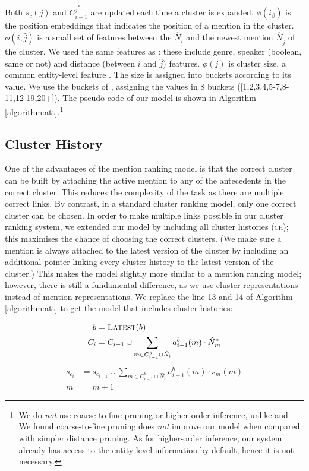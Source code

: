 \documentclass[10pt, a4paper]{article}
\newcommand{\ACRO}[1]{\textsc{#1}}
\begin{document}
Both $s_c(j)$ and $C^{j^*}_{i-1}$ are updated each time a cluster is expanded. 
$\phi(i_\beta)$ is the position embeddings that indicates the position of a mention in the cluster. $\phi(i,\hat{j})$ is a small set of features between the $\hat{N}_i$ and the newest mention $\hat{N}_{\hat{j}}$ of the cluster. 
We used the same features as :
these include genre, speaker (boolean, same or not) and distance (between $i$ and $\hat{j}$) features. $\phi(j)$ is cluster size, 
a common entity-level feature \cite{bjorkelund2014learning}. 
The size is assigned into buckets according to its value. We use the buckets of , assigning the values in 8 buckets ([1,2,3,4,5-7,8-11,12-19,20+]).
The pseudo-code of our model is shown in Algorithm \ref{algorithm:att}.\footnote{We do \textit{not} use  coarse-to-fine pruning or higher-order inference, unlike  and .  
We found coarse-to-fine pruning  does \textit{not} improve our model when compared with simpler distance pruning. 
As for higher-order inference, our system  already has access to the entity-level information by default, hence it is not necessary.} 


\subsection{Cluster History}

One of the advantages of the mention ranking model is that the correct cluster can be built by attaching the active mention to any of the antecedents in the correct cluster. 
This reduces the complexity of the task as there are multiple correct links. 
By contrast, in a standard cluster ranking model, only one correct cluster can be chosen. 
In order to make 
multiple links possible in our
cluster ranking system, we extended our
model by including all cluster histories (\ACRO{ch});
this maximises the chance of choosing 
the correct clusters.  
(We make sure a mention is always attached to the latest version of the cluster by including
an additional pointer linking  
every cluster history 
to the latest version of the cluster.)
This makes the model slightly more similar to a mention ranking model; 
however, there is still a fundamental difference, as we use  cluster representations instead of  mention representations.
We replace the line 13 and 14 of Algorithm \ref{algorithm:att} 
to get the model 
that includes  cluster histories:


\vspace{-10pt}
\small
\begin{align*}
b &= \textsc{Latest}(b)\\
C_i &= C_{i-1} \cup  \sum_{m \in C^b_{i-1} \cup \hat{N}_i} a_{i-1}^{b}(m) \cdot \hat{N}_m^*
\end{align*}
\begin{align*}
s_{c_i} &= s_{c_{i-1}}\cup \sum_{m \in C^b_{i-1} \cup \hat{N}_i} a_{i-1}^{b}(m) \cdot s_m(m)\\
m &= m+1
\end{align*}
\normalsize
\end{document}

